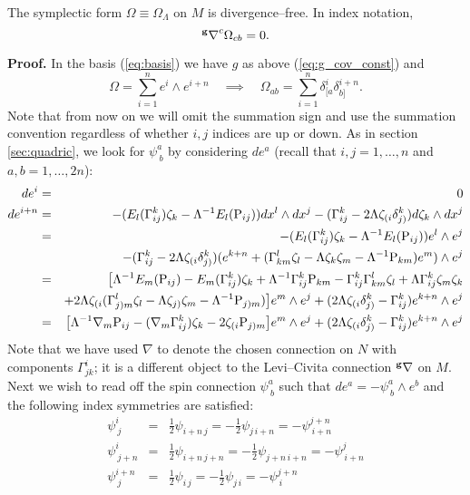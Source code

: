 \begin{lemma} \label{lem:div_free} The symplectic form $\Omega\equiv\Omega_\Lambda$ on $M$ is divergence--free. In index notation,
\[
{^{\bf g}\nabla}^c\Omega_{cb}=0.
\]
\end{lemma}

{\bf Proof.} In the basis
(\ref{eq:basis}) we have $g$ as above (\ref{eq:g_cov_const})
and
\[
\Omega=\sum_{i=1}^{n}e^{i}\wedge e^{i+n}\quad\implies\quad\Omega_{ab}=\sum_{i=1}^{n}\delta_{[a}^{i}\delta_{b]}^{i+n}.
\]
Note that from now on we will omit the summation sign and use the
summation convention regardless of whether $i,j$ indices are up or
down. As in section \ref{sec:quadric}, we look for $\psi_{\ b}^{a}$
by considering $ de^{a}$ (recall that $i,j=1,\dots,n$ and
$a,b=1,\dots,2n$):
\begin{eqnarray*}
 de^{i} & = & 0\\
 de^{i+n} & = & -(E_{l}(\Gamma_{ij}^{k})\zeta_{k}-\Lambda^{-1}E_{l}(\mathrm{P}_{ij})) dx^{l}\wedge dx^{j}-(\Gamma_{ij}^{k}-2\Lambda \zeta_{(i}\delta_{j)}^{k}) d\zeta_{k}\wedge dx^{j}\\
 & = & -(E_{l}(\Gamma_{ij}^{k})\zeta_{k}-\Lambda^{-1}E_{l}(\mathrm{P}_{ij}))e^{l}\wedge e^{j}\\
 &  & -(\Gamma_{ij}^{k}-2\Lambda \zeta_{(i}\delta_{j)}^{k})(e^{k+n}+(\Gamma_{km}^{l}\zeta_{l}-\Lambda \zeta_{k}\zeta_{m}-\Lambda^{-1}\mathrm{P}_{km})e^{m})\wedge e^{j}\\
 & = & \bigl[\Lambda^{-1}E_{m}(\mathrm{P}_{ij})-E_{m}(\Gamma_{ij}^{k})\zeta_{k}+\Lambda^{-1}\Gamma_{ij}^{k}\mathrm{P}_{km}-\Gamma_{ij}^{k}\Gamma_{km}^{l}\zeta_{l}+\Lambda\Gamma_{ij}^{k}\zeta_{m}\zeta_{k}\\
 &  & +2\Lambda \zeta_{(i}(\Gamma_{j)m}^{l}\zeta_{l}-\Lambda \zeta_{j)}\zeta_{m}-\Lambda^{-1}\mathrm{P}_{j)m})\bigr]e^{m}\wedge e^{j}+(2\Lambda \zeta_{(i}\delta_{j)}^{k}-\Gamma_{ij}^{k})e^{k+n}\wedge e^{j}\\
 & = & \bigl[\Lambda^{-1}{\nabla}_{m}\mathrm{P}_{ij}-({\nabla}_{m}\Gamma_{ij}^{k})\zeta_{k}-2\zeta_{(i}\mathrm{P}_{j)m}\bigr]e^{m}\wedge e^{j}+(2\Lambda \zeta_{(i}\delta_{j)}^{k}-\Gamma_{ij}^{k})e^{k+n}\wedge e^{j}\\
\end{eqnarray*}
Note that we have used ${\nabla}$ to denote the chosen connection on $N$
with components $\Gamma_{jk}^{i}$; it is a different object to the Levi--Civita connection $^{\bf g}\nabla$ on $M$. Next we wish to read off the spin
connection $\psi_{\ b}^{a}$ such that ${d}e^{a}=-\psi_{\ b}^{a}\wedge e^{b}$
and the following index symmetries are satisfied:
\begin{eqnarray*}
\psi_{\ j}^{i} & = & \frac{1}{2}\psi_{i+n\, j}=-\frac{1}{2}\psi_{j\, i+n}=-\psi_{\ i+n}^{j+n}\\
\psi_{\ j+n}^{i} & = & \frac{1}{2}\psi_{i+n\, j+n}=-\frac{1}{2}\psi_{j+n\, i+n}=-\psi_{\ i+n}^{j}\\
\psi_{\ j}^{i+n} & = & \frac{1}{2}\psi_{i\, j}=-\frac{1}{2}\psi_{j\, i}=-\psi_{\ i}^{j+n}
\end{eqnarray*}
